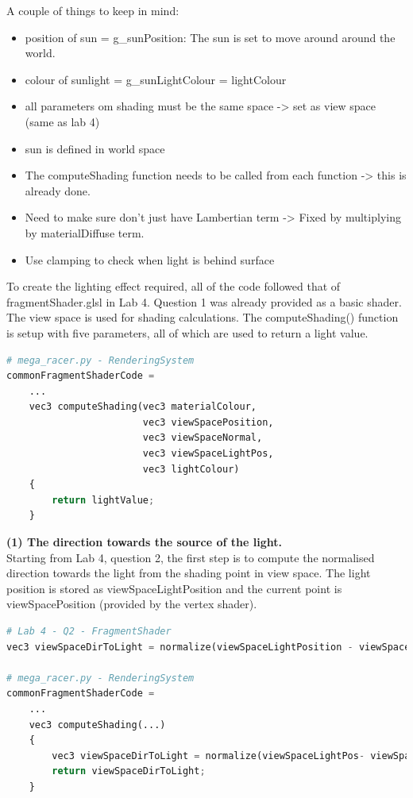 \documentclass[a4 paper, 12pt]{article}
\begin{document}
A couple of things to keep in mind:
    \begin{itemize}
        \item position of sun = g\_sunPosition: The sun is set to move around around the world.
        \item colour of sunlight = g\_sunLightColour = lightColour
        \item all parameters om shading must be the same space -> set as view space (same as lab 4) 
        \item sun is defined in world space
        \item The computeShading function needs to be called from each function -> this is already done.
        \item Need to make sure don't just have Lambertian term -> Fixed by multiplying by materialDiffuse term.
        \item Use clamping to check when light is behind surface
    \end{itemize}


To create the lighting effect required, all of the code followed that of fragmentShader.glsl in Lab 4. Question 1 was already provided as a basic shader. The view space is used for shading calculations. The computeShading() function is setup with five parameters, all of which are used to return a light value.
    \begin{lstlisting}[language=python] 
# mega_racer.py - RenderingSystem
commonFragmentShaderCode =
    ...
    vec3 computeShading(vec3 materialColour, 
                        vec3 viewSpacePosition, 
                        vec3 viewSpaceNormal, 
                        vec3 viewSpaceLightPos, 
                        vec3 lightColour)
    {
        return lightValue;
    }
    \end{lstlisting}

\textbf{(1) The direction towards the source of the light.} \\
Starting from Lab 4, question 2, the first step is to compute the normalised direction towards the light from the shading point in view space. The light position is stored as viewSpaceLightPosition and the current point is viewSpacePosition (provided by the vertex shader). 
    \begin{lstlisting}[language=python] 
# Lab 4 - Q2 - FragmentShader
vec3 viewSpaceDirToLight = normalize(viewSpaceLightPosition - viewSpacePosition);
    
# mega_racer.py - RenderingSystem
commonFragmentShaderCode =
    ...
    vec3 computeShading(...)
    {
        vec3 viewSpaceDirToLight = normalize(viewSpaceLightPos- viewSpacePosition);
        return viewSpaceDirToLight;
    }
    \end{lstlisting}
\end{document}
